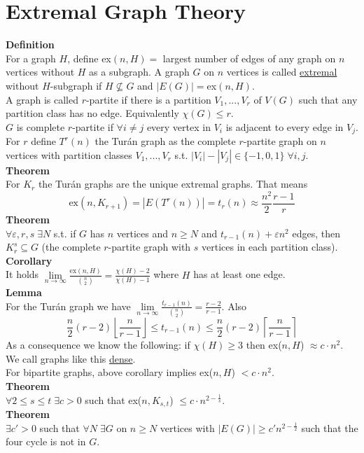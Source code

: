 \documentclass[a4paper, 12pt]{article}
\begin{document}
	\section{Extremal Graph Theory}
	\textbf{Definition}\\
	For a graph $H$, define ex$(n,H) =$ largest number of edges of any graph on $n$ vertices without $H$ as a subgraph. A graph $G$ on $n$ vertices is called \underline{extremal} without $H$-subgraph if $H\not \subseteq G$ and $\left|E(G)\right| = $ex$(n,H)$.\\
	A graph is called $r$-partite if there is a partition $V_1,...,V_r$ of $V(G)$ such that any partition class has no edge. Equivalently $\chi(G) \leq r$.\\
	$G$ is complete $r$-partite if $\forall i \neq j$ every vertex in $V_i$ is adjacent to every edge in $V_j$. For $r$ define $T^r(n)$ the Turán graph as the complete $r$-partite graph on $n$ vertices with partition classes $V_1,...,V_r$ s.t. $\left|V_i\right| - \left|V_j\right| \in \{-1,0,1\} \; \forall i,j$.\\
	\textbf{Theorem}\\
	For $K_r$ the Turán graphs are the unique extremal graphs. That means \[\text{ex}(n,K_{r+1}) = \left|E(T^r(n))\right| = t_r(n) \approx \frac{n^2}{2} \frac{r-1}{r}\]
	\textbf{Theorem}\\
	$\forall \varepsilon,r,s \; \exists N$ s.t. if $G$ has $n$ vertices and $n \geq N$ and $t_{r-1}(n) + \varepsilon n^2$ edges, then $K_r^s \subseteq G$ (the complete $r$-partite graph with $s$ vertices in each partition class).\\
	\textbf{Corollary}\\
	It holds $\lim\limits_{n \to \infty} \frac{\text{ex}(n,H)}{\binom{n}{2}} = \frac{\chi(H)-2}{\chi(H)-1}$ where $H$ has at least one edge.\\
	\textbf{Lemma}\\
	For the Turán graph we have $\lim\limits_{n \to \infty} \frac{t_{r-1}(n)}{\binom{n}{2}} = \frac{r-2}{r-1}$. Also \[\frac{n}{2} (r-2) \left\lfloor\frac{n}{r-1}\right\rfloor \leq t_{r-1}(n) \leq \frac{n}{2} (r-2) \left\lceil\frac{n}{r-1}\right\rceil\]
	As a consequence we know the following: if $\chi(H) \geq 3$ then ex($n,H$) $\approx c\cdot n^2$. We call graphs like this \underline{dense}.\\
	For bipartite graphs, above corollary implies ex($n,H$) $< c\cdot n^2$.\\
	\textbf{Theorem}\\
	$\forall 2 \leq s \leq t \; \exists c > 0$ such that ex($n,K_{s,t}$) $\leq c\cdot n^{2-\frac{1}{s}}$.\\
	\textbf{Theorem}\\
	$\exists c'>0$ such that $\forall N \; \exists G$ on $n \geq N$ vertices with $\left|E(G)\right| \geq c'n^{2-\frac{1}{2}}$ such that the four cycle is not in $G$.
\end{document}
